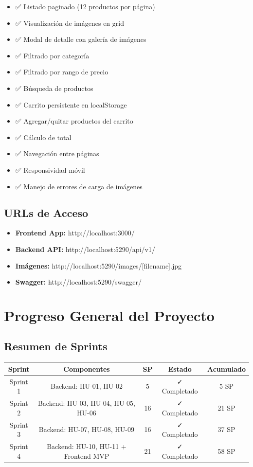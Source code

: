 \documentclass[12pt,a4paper]{article}
\begin{document}
\begin{itemize}
    \item ✅ Listado paginado (12 productos por página)
    \item ✅ Visualización de imágenes en grid
    \item ✅ Modal de detalle con galería de imágenes
    \item ✅ Filtrado por categoría
    \item ✅ Filtrado por rango de precio
    \item ✅ Búsqueda de productos
    \item ✅ Carrito persistente en localStorage
    \item ✅ Agregar/quitar productos del carrito
    \item ✅ Cálculo de total
    \item ✅ Navegación entre páginas
    \item ✅ Responsividad móvil
    \item ✅ Manejo de errores de carga de imágenes
\end{itemize}

\subsection{URLs de Acceso}

\begin{itemize}
    \item \textbf{Frontend App:} http://localhost:3000/
    \item \textbf{Backend API:} http://localhost:5290/api/v1/
    \item \textbf{Imágenes:} http://localhost:5290/images/[filename].jpg
    \item \textbf{Swagger:} http://localhost:5290/swagger/
\end{itemize}

\section{Progreso General del Proyecto}

\subsection{Resumen de Sprints}

\begin{center}
\begin{tabular}{|c|c|c|c|c|}
\hline
\textbf{Sprint} & \textbf{Componentes} & \textbf{SP} & \textbf{Estado} & \textbf{Acumulado} \\
\hline
Sprint 1 & Backend: HU-01, HU-02 & 5 & ✓ Completado & 5 SP \\
\hline
Sprint 2 & Backend: HU-03, HU-04, HU-05, HU-06 & 16 & ✓ Completado & 21 SP \\
\hline
Sprint 3 & Backend: HU-07, HU-08, HU-09 & 16 & ✓ Completado & 37 SP \\
\hline
Sprint 4 & Backend: HU-10, HU-11 + Frontend MVP & 21 & ✓ Completado & 58 SP \\
\hline
\end{tabular}
\end{center}
\end{document}
